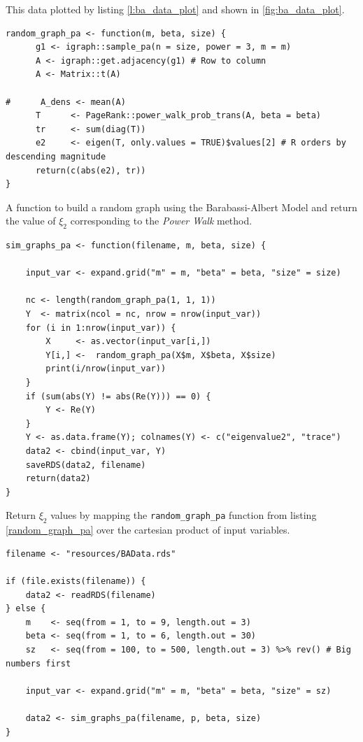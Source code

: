 \documentclass[11pt]{article}
\begin{document}
This data plotted by listing \ref{l:ba_data_plot} and shown in \ref{fig:ba_data_plot}.

\begin{listing}[htbp]
\begin{verbatim}
random_graph_pa <- function(m, beta, size) {
      g1 <- igraph::sample_pa(n = size, power = 3, m = m)
      A <- igraph::get.adjacency(g1) # Row to column
      A <- Matrix::t(A)

#      A_dens <- mean(A)
      T      <- PageRank::power_walk_prob_trans(A, beta = beta)
      tr     <- sum(diag(T))
      e2     <- eigen(T, only.values = TRUE)$values[2] # R orders by descending magnitude
      return(c(abs(e2), tr))
}
\end{verbatim}
\caption{\label{random_graph_pa}A function to build a random graph using the Barabassi-Albert Model and return the value of \(\xi_{2}\) corresponding to the \emph{Power Walk} method.}
\end{listing}

\begin{listing}[htbp]
\begin{verbatim}
sim_graphs_pa <- function(filename, m, beta, size) {

    input_var <- expand.grid("m" = m, "beta" = beta, "size" = size)

    nc <- length(random_graph_pa(1, 1, 1))
    Y  <- matrix(ncol = nc, nrow = nrow(input_var))
    for (i in 1:nrow(input_var)) {
        X     <- as.vector(input_var[i,])
        Y[i,] <-  random_graph_pa(X$m, X$beta, X$size)
        print(i/nrow(input_var))
    }
    if (sum(abs(Y) != abs(Re(Y))) == 0) {
        Y <- Re(Y)
    }
    Y <- as.data.frame(Y); colnames(Y) <- c("eigenvalue2", "trace")
    data2 <- cbind(input_var, Y)
    saveRDS(data2, filename)
    return(data2)
}
\end{verbatim}
\caption{\label{sim_graphs_pa}Return \(\xi_{2}\) values by mapping the \texttt{random\_graph\_pa} function from listing \ref{random_graph_pa} over the cartesian product of input variables.}
\end{listing}


\begin{listing}[htbp]
\begin{verbatim}
filename <- "resources/BAData.rds"

if (file.exists(filename)) {
    data2 <- readRDS(filename)
} else {
    m    <- seq(from = 1, to = 9, length.out = 3)
    beta <- seq(from = 1, to = 6, length.out = 30)
    sz   <- seq(from = 100, to = 500, length.out = 3) %>% rev() # Big numbers first

    input_var <- expand.grid("m" = m, "beta" = beta, "size" = sz)

    data2 <- sim_graphs_pa(filename, p, beta, size)
}
\end{verbatim}
\label{l:gen_ba_data}
\end{listing}
\end{document}
